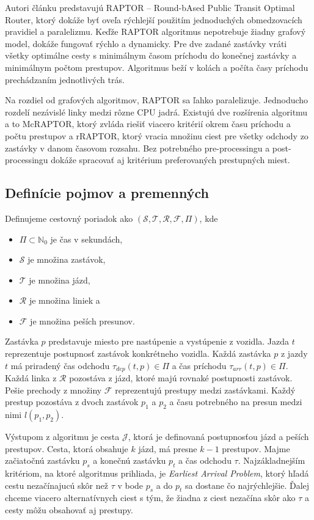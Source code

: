 Autori článku \cite{raptor} predstavujú RAPTOR – Round-bAsed Public Transit Optimal Router, ktorý dokáže byť oveľa rýchlejší použitím jednoduchých obmedzovacích pravidiel a paralelizmu. Keďže RAPTOR algoritmus nepotrebuje žiadny grafový model, dokáže fungovať rýchlo a dynamicky. Pre dve zadané zastávky vráti všetky optimálne cesty s minimálnym časom príchodu do konečnej zastávky a minimálnym počtom prestupov. Algoritmus beží v kolách a počíta časy príchodu prechádzaním jednotlivých trás.

Na rozdiel od grafových algoritmov, RAPTOR sa ľahko paralelizuje. Jednoducho rozdelí nezávislé linky medzi rôzne CPU jadrá. Existujú dve rozšírenia algoritmu a to McRAPTOR, ktorý zvláda riešiť viacero kritérií okrem času príchodu a počtu prestupov a rRAPTOR, ktorý vracia množinu ciest pre všetky odchody zo zastávky v danom časovom rozsahu. Bez potrebného pre-processingu a post-processingu dokáže spracovať aj kritérium preferovaných prestupných miest.

\subsection{Definície pojmov a premenných}
\label{sec:raptor-definitions}

Definujeme cestovný poriadok ako $(\mathcal{S,T,R,F},\Pi)$, kde 
\begin{itemize}
\setlength\itemsep{-0.3em}
\item $\Pi \subset \mathbb{N}_{0}$ je čas v sekundách, 
\item $\mathcal{S}$ je množina zastávok,
\item $\mathcal{T}$ je množina jázd, 
\item $\mathcal{R}$ je množina liniek a 
\item $\mathcal{F}$ je množina peších presunov.
\end{itemize}

Zastávka $p$ predstavuje miesto pre nastúpenie a vystúpenie z vozidla. Jazda $t$ reprezentuje postupnosť zastávok konkrétneho vozidla. Každá zastávka $p$ z jazdy $t$ má priradený čas odchodu $\tau_{dep}(t, p) \in \Pi$ a čas príchodu $\tau_{arr}(t, p) \in \Pi$. Každá linka z $\mathcal{R}$ pozostáva z jázd, ktoré majú rovnaké postupnosti zastávok. Pešie prechody z množiny $\mathcal{F}$ reprezentujú prestupy medzi zastávkami. Každý prestup pozostáva z dvoch zastávok $p_1$ a $p_2$ a času potrebného na presun medzi nimi $l(p_1, p_2)$. 

Výstupom z algoritmu je cesta $\mathcal{J}$, ktorá je definovaná postupnosťou jázd a peších prestupov. Cesta, ktorá obsahuje $k$ jázd, má presne $k-1$ prestupov. Majme začiatočnú zastávku $p_s$ a konečnú zastávku $p_t$ a čas odchodu $\tau$. Najzákladnejším kritériom, na ktoré algoritmus prihliada, je \textit{Earliest Arrival Problem}, ktorý hľadá cestu nezačínajucú skôr než $\tau$ v bode $p_s$ a do $p_t$ sa dostane čo najrýchlejšie. Ďalej chceme viacero alternatívnych ciest s tým, že žiadna z ciest nezačína skôr ako $\tau$ a cesty môžu obsahovať aj prestupy. 

